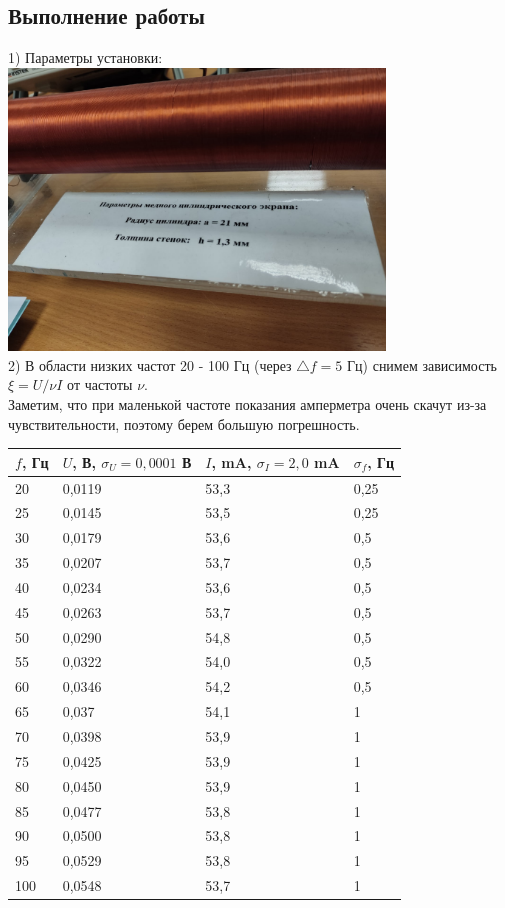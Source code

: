 \documentclass[a4paper]{article}
\begin{document}
\subsection{Выполнение работы}
1) Параметры установки:\\
\includegraphics[width=10cm]{g2}\\
2)  В области низких частот 20 - 100 Гц (через $\triangle f = 5$ Гц) снимем зависимость $\xi = U/\nu I$ от частоты $\nu$.\\
Заметим, что при маленькой частоте показания амперметра очень скачут из-за чувствительности, поэтому берем большую погрешность.\\
\begin{tabular}{|l|l|l|l|}\\
\hline
$f$, Гц & $U$, В, $\sigma_{U} = 0,0001$ В & $I$, mA, $\sigma_I = 2,0$ mA & $\sigma_{f}$, Гц\\ \hline
20 & 0,0119 & 53,3 & 0,25 \\ \hline
25 & 0,0145 & 53,5 & 0,25 \\ \hline
30 & 0,0179 & 53,6 & 0,5 \\ \hline
35 & 0,0207 & 53,7 & 0,5 \\ \hline
40 & 0,0234 & 53,6 & 0,5 \\ \hline
45 & 0,0263 & 53,7 & 0,5 \\ \hline
50 & 0,0290 & 54,8 & 0,5 \\ \hline
55 & 0,0322 & 54,0 & 0,5 \\ \hline
60 & 0,0346 & 54,2 & 0,5 \\ \hline
65 & 0,037 & 54,1 & 1 \\ \hline
70 & 0,0398 & 53,9 & 1\\ \hline
75 & 0,0425 & 53,9 & 1\\ \hline
80 & 0,0450 & 53,9 & 1 \\ \hline
85 & 0,0477 & 53,8 & 1\\ \hline
90 & 0,0500 & 53,8 & 1 \\ \hline
95 & 0,0529 & 53,8 & 1\\ \hline
100 & 0,0548 & 53,7 & 1 \\ \hline
\end{tabular}\\
\end{document}

